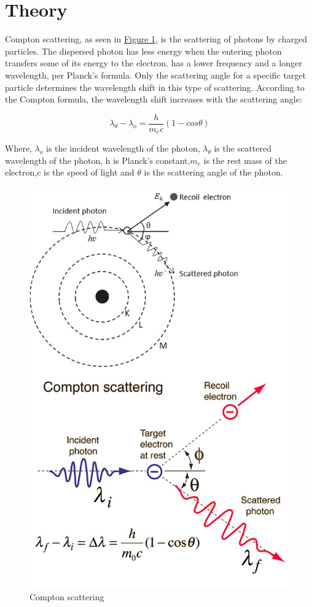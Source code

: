 \section{Theory}
	Compton scattering, as seen in \hyperref[th:1]{Figure 1}, is the scattering of photons by charged particles. The dispersed photon has less energy when the entering photon transfers some of its energy to the electron. has a lower frequency and a longer wavelength, per Planck's formula. Only the scattering angle for a specific target particle determines the wavelength shift in this type of scattering. According to the Compton formula, the wavelength shift increases with the scattering angle:

	\begin{equation}
		\lambda_{\theta}-\lambda_o = \frac{h}{m_ec}(1-cos\theta)
		\label{eq:1}
	\end{equation}

	Where, $\lambda_o$ is the incident wavelength of the photon, $\lambda_{\theta}$ is the scattered wavelength of the photon, h is Planck's constant,$m_e$ is the rest mass of the electron,c is the speed of light and $\theta$ is the scattering angle of the photon.

	\begin{figure}
		\centering
		\includegraphics[width=0.6\columnwidth]{images/t1.png}
		\caption{Compton scattering}
		\label{th:1}
	\end{figure}

